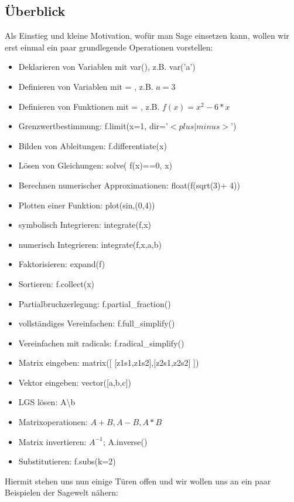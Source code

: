 \documentclass[fontsize=12pt,paper=a4,twoside,bibtotoc,idxtotoc,
liststotoc,pagesize,BCOR1.2cm,DIV15,chapterprefix,pagesize=pdftex]{scrbook}
\begin{document}
\subsection{Überblick}

Als Einstieg und kleine Motivation, wofür man Sage einsetzen kann, wollen wir erst einmal ein paar grundlegende Operationen 
vorstellen:
\begin{itemize}
 \item Deklarieren von Variablen mit var(), z.B. var('a')
 \item Definieren von Variablen mit = , z.B. $a=3$
 \item Definieren von Funktionen mit = , z.B. $f(x) = x^2 - 6*x$
 \item Grenzwertbestimmung: f.limit(x=1, dir='$<plus|minus>$')
 \item Bilden von Ableitungen: f.differentiate(x)
 \item Lösen von Gleichungen: solve( f(x)==0, x)
 \item Berechnen numerischer Approximationen: float(f(sqrt(3)+ 4))
 \item Plotten einer Funktion: plot(sin,(0,4))
 \item symbolisch Integrieren: integrate(f,x)
 \item numerisch Integrieren: integrate(f,x,a,b)
 \item Faktorisieren: expand(f)
 \item Sortieren: f.collect(x)
 \item Partialbruchzerlegung: f.partial\_fraction()
 \item vollständiges Vereinfachen: f.full\_simplify()
 \item Vereinfachen mit radicals: f.radical\_simplify()
 \item Matrix eingeben: matrix([ [z1s1,z1s2],[z2s1,z2s2] ])
 \item Vektor eingeben: vector([a,b,c])
 \item LGS lösen: A\textbackslash b
 \item Matrixoperationen: $A+B,A-B,A*B$
 \item Matrix invertieren: $A^{-1}$; A.inverse()
 \item Substitutieren: f.subs(k=2)
\end{itemize}
Hiermit stehen uns nun einige Türen offen und wir wollen uns an ein paar Beispielen der Sagewelt nähern:\newpage

\end{document}
